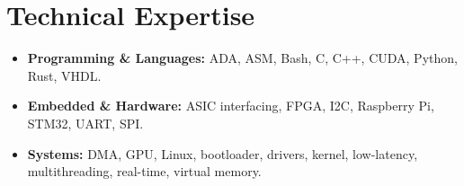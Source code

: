 \documentclass[9pt,a4paper]{article}
\begin{document}
\section*{Technical Expertise}
\begin{tcolorbox}[mybox]
\begin{itemize}
\item \textbf{Programming \& Languages:} ADA, ASM, Bash, C, C++, CUDA, Python, Rust, VHDL.

\item \textbf{Embedded \& Hardware:} ASIC interfacing, FPGA, I2C, Raspberry Pi, STM32, UART, SPI.

\item \textbf{Systems:} DMA, GPU, Linux, bootloader, drivers, kernel, low-latency, multithreading, real-time, virtual memory.
\end{itemize}
\end{tcolorbox}
\end{document}
